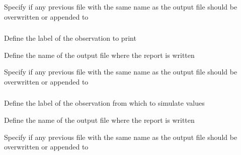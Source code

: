  {Specify if any previous file with the same name as the output file should be overwritten or appended to}

\subsubsection[Print a summary of the an observation, including fits, and residuals]{}

 {Define the label of the observation to print}

 {Define the name of the output file where the report is written}

 {Specify if any previous file with the same name as the output file should be overwritten or appended to}

\subsubsection[Print an observation using simulated values]{}

 {Define the label of the observation from which to simulate values}

 {Define the name of the output file where the report is written}

 {Specify if any previous file with the same name as the output file should be overwritten or appended to}

\subsubsection[Print an ageing error misclassification matrix]{}

